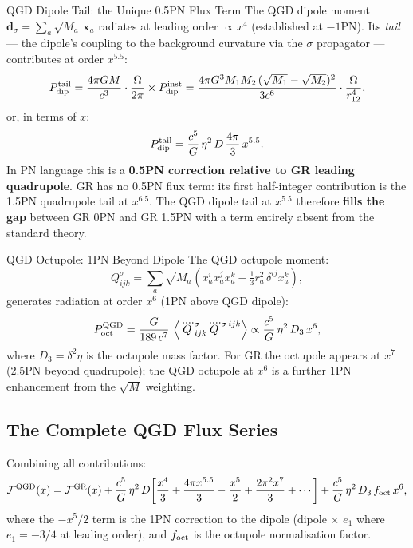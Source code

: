 \documentclass[11pt,a4paper]{article}
\theoremstyle{definition}
\theoremstyle{remark}
\begin{document}
	QGD Dipole Tail: the Unique 0.5PN Flux Term
		The QGD dipole moment $\boldsymbol{d}_\sigma=\sum_a\sqrt{M_a}\,\mathbf{x}_a$
		radiates at leading order $\propto x^4$ (established at $-1$PN).  Its
		\emph{tail} — the dipole's coupling to the background curvature via
		the $\sigma$ propagator — contributes at order $x^{5.5}$:
		\begin{equation}
			P_{\rm dip}^{\rm tail}
			= \frac{4\pi G M}{c^3}\cdot\frac{\Omega}{2\pi}
			\times P_{\rm dip}^{\rm inst}
			= \frac{4\pi G^3 M_1 M_2\,(\sqrt{M_1}-\sqrt{M_2})^2}{3c^6}\cdot
			\frac{\Omega}{r_{12}^4},
			\label{eq:dip_tail}
		\end{equation}
		or, in terms of $x$:
		\begin{equation}
			P_{\rm dip}^{\rm tail}
			= \frac{c^5}{G}\,\eta^2\,D\,\frac{4\pi}{3}\,x^{5.5}.
			\label{eq:dip_tail_x}
		\end{equation}
		In PN language this is a \textbf{0.5PN correction relative to GR leading
			quadrupole}.  GR has no 0.5PN flux term: its first half-integer
		contribution is the 1.5PN quadrupole tail at $x^{6.5}$.  The QGD dipole
		tail at $x^{5.5}$ therefore \textbf{fills the gap} between GR 0PN and
		GR 1.5PN with a term entirely absent from the standard theory.
	
	QGD Octupole: 1PN Beyond Dipole
		The QGD octupole moment:
		\begin{equation}
			Q_{ijk}^\sigma
			= \sum_a \sqrt{M_a}\!\left(x_a^i x_a^j x_a^k - \tfrac{1}{3}r_a^2\,\delta^{ij}x_a^k\right),
		\end{equation}
		generates radiation at order $x^6$ (1PN above QGD dipole):
		\begin{equation}
			P_{\rm oct}^{\rm QGD}
			= \frac{G}{189\,c^7}\,\left\langle\ddddot{Q}_{ijk}^\sigma\ddddot{Q}^{\sigma\,ijk}\right\rangle
			\propto \frac{c^5}{G}\,\eta^2\,D_3\,x^6,
			\label{eq:oct_power}
		\end{equation}
		where $D_3=\delta^2\eta$ is the octupole mass factor.  For GR the
		octupole appears at $x^7$ (2.5PN beyond quadrupole); the QGD octupole
		at $x^6$ is a further 1PN enhancement from the $\sqrt{M}$ weighting.
	
	\subsection{The Complete QGD Flux Series}
	
	Combining all contributions:
	\begin{equation}
		\mathcal{F}^{\rm QGD}(x)
		= \mathcal{F}^{\rm GR}(x)
		+ \frac{c^5}{G}\,\eta^2\,D\!\left[
		\frac{x^4}{3}
		+ \frac{4\pi x^{5.5}}{3}
		- \frac{x^5}{2}
		+ \frac{2\pi^2 x^7}{3}
		+ \cdots
		\right]
		+ \frac{c^5}{G}\,\eta^2\,D_3\,f_{\rm oct}\,x^6,
		\label{eq:qgd_flux_full}
	\end{equation}
	where the $-x^5/2$ term is the 1PN correction to the dipole
	(dipole $\times$ $e_1$ where $e_1=-3/4$ at leading order),
	and $f_{\rm oct}$ is the octupole normalisation factor.
	
\end{document}
